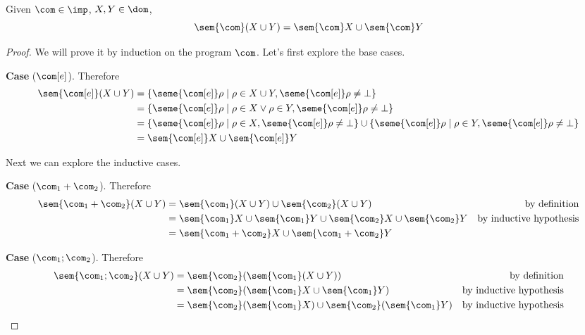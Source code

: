 \begin{observation}
  Given \(\com\in\imp\), \(X,Y \in \dom\),
  \[\sem{\com}(X\cup Y) = \sem{\com}X \cup \sem{\com}Y\]
\end{observation}

\begin{proof}
  We will prove it by induction on the program \(\com\). Let's first
  explore the base cases.

  \medskip

  \noindent
  \textbf{Case} (\(\com[e]\)). Therefore
  \begin{align*}
    \sem{\com[e]}(X\cup Y) & = \{\seme{\com[e]}\rho \mid \rho \in X \cup Y, \seme{\com[e]}\rho \neq \bot\} \\
                           & = \{\seme{\com[e]}\rho \mid \rho \in X \vee \rho \in Y, \seme{\com[e]}\rho \neq \bot\} \\
                           & = \{\seme{\com[e]}\rho \mid \rho \in X , \seme{\com[e]}\rho \neq \bot\} \cup \{\seme{\com[e]}\rho \mid \rho \in Y , \seme{\com[e]}\rho \neq \bot\} \\
                           & = \sem{\com[e]}X \cup \sem{\com[e]}Y
  \end{align*}
  
  \medskip

  \noindent
  Next we can explore the inductive cases.

  \medskip
  
  \noindent
  \textbf{Case} (\(\com_1 + \com_2\)). Therefore
  \begin{align*}
    \sem{\com_1 + \com_2}(X\cup Y) & = \sem{\com_1}(X \cup Y) \cup \sem{\com_2}(X \cup Y) & \text{by definition}\\
                                   & = \sem{\com_1}X \cup \sem{\com_1}Y \cup \sem{\com_2}X \cup \sem{\com_2}Y & \text{by inductive hypothesis} \\
                                   & = \sem{\com_1 + \com_2} X \cup \sem{\com_1 + \com_2} Y
  \end{align*}

  \medskip

  \noindent
  \textbf{Case} (\(\com_1; \com_2\)). Therefore
  \begin{align*}
    \sem{\com_1 ; \com_2}(X\cup Y) & = \sem{\com_2}(\sem{\com_1}(X \cup Y)) & \text{by definition}\\
                                   & = \sem{\com_2}(\sem{\com_1}X \cup \sem{\com_1}Y) & \text{by inductive hypothesis}\\
                                   & = \sem{\com_2}(\sem{\com_1}X) \cup \sem{\com_2}(\sem{\com_1}Y) & \text{by inductive hypothesis}
  \end{align*}
  

\end{proof}
